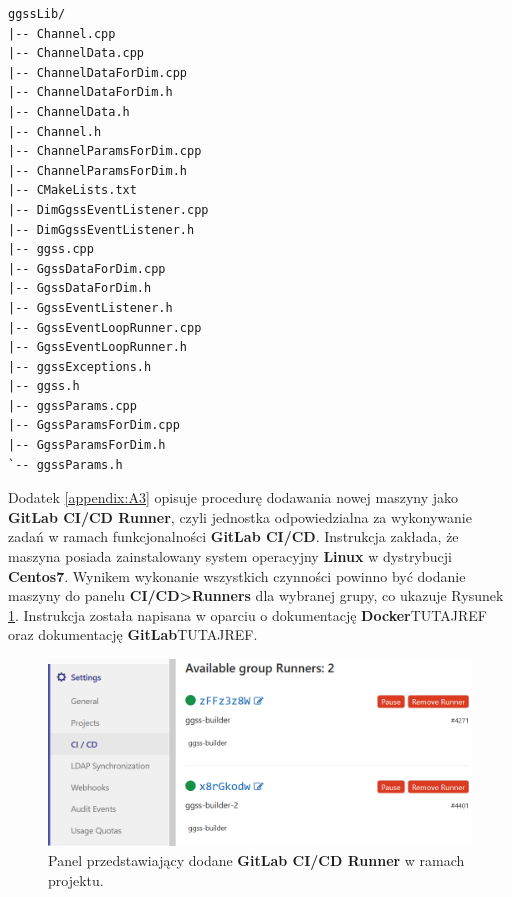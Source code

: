 \newpage

\begin{lstlisting}
ggssLib/
|-- Channel.cpp
|-- ChannelData.cpp
|-- ChannelDataForDim.cpp
|-- ChannelDataForDim.h
|-- ChannelData.h
|-- Channel.h
|-- ChannelParamsForDim.cpp
|-- ChannelParamsForDim.h
|-- CMakeLists.txt
|-- DimGgssEventListener.cpp
|-- DimGgssEventListener.h
|-- ggss.cpp
|-- GgssDataForDim.cpp
|-- GgssDataForDim.h
|-- GgssEventListener.h
|-- GgssEventLoopRunner.cpp
|-- GgssEventLoopRunner.h
|-- ggssExceptions.h
|-- ggss.h
|-- ggssParams.cpp
|-- GgssParamsForDim.cpp
|-- GgssParamsForDim.h
`-- ggssParams.h
\end{lstlisting}

\onecolumn




\newpage





Dodatek \ref{appendix:A3} opisuje procedurę dodawania nowej maszyny jako \textbf{GitLab CI/CD Runner}, czyli jednostka odpowiedzialna za wykonywanie zadań w ramach funkcjonalności \textbf{GitLab CI/CD}. Instrukcja zakłada, że maszyna posiada zainstalowany system operacyjny \textbf{Linux} w dystrybucji \textbf{Centos7}. Wynikem wykonanie wszystkich czynności powinno być dodanie maszyny do panelu \textbf{CI/CD>Runners} dla wybranej grupy, co ukazuje Rysunek \ref{fig:runner}. Instrukcja została napisana w oparciu o dokumentację \textbf{Docker}TUTAJREF oraz dokumentację \textbf{GitLab}TUTAJREF.

\begin{figure}
\caption{Panel przedstawiający dodane \textbf{GitLab CI/CD Runner} w ramach projektu.}
\label{fig:runner}
\includegraphics[width=\textwidth]{res/png/runnerAdded}
\end{figure}

